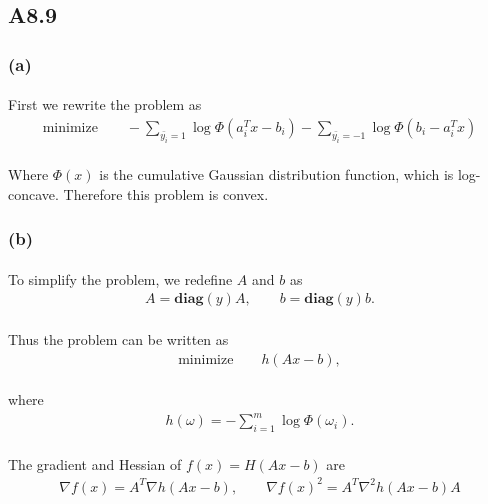 \subsection*{A8.9}
\subsubsection*{(a)}
\paragraph{}
First we rewrite the problem as 
\begin{align*}
\text{minimize}\qquad -\sum_{\bar{y_i}=1}\log \Phi(a_i^Tx -b_i)  -\sum_{\bar{y_i}=-1}\log \Phi(b_i  - a_i^Tx) 
\end{align*}
\paragraph{}
Where $\Phi(x)$ is the cumulative Gaussian distribution function, which is log-concave. Therefore this problem is convex.
\subsubsection*{(b)}
\paragraph{}
To simplify the problem, we redefine $A$ and $b$ as 
\begin{align*}
A = \textbf{diag}(y)A, \qquad b=\textbf{diag}(y)b.
\end{align*}
\paragraph{}
Thus the problem can be written as
\begin{align*}
\text{minimize}\qquad h(Ax-b),
\end{align*}
\paragraph{}
where
\begin{align*}
h(\omega) = -\sum_{i=1}^{m}\log \Phi(\omega_i).
\end{align*}
\paragraph{}
The gradient and Hessian of $f(x) = H(Ax-b)$ are
\begin{align*}
\nabla f(x) = A^T\nabla h(Ax-b),\qquad \nabla f(x)^2 = A^T\nabla^2 h(Ax-b)A 
\end{align*}
